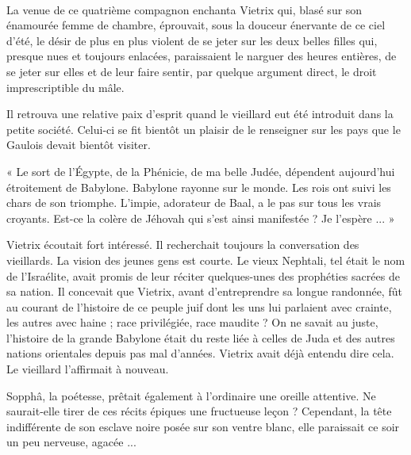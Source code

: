 \documentclass[a4paper, 11pt, oneside, polutonikogreek, french]{article}
\begin{document}
\paragraph{}
La venue de ce quatrième compagnon enchanta Vietrix qui, blasé sur son énamourée femme de chambre, éprouvait, sous la douceur énervante de ce ciel d'été, le désir de plus en plus violent de se jeter sur les deux belles filles qui, presque nues et toujours enlacées, paraissaient le narguer des heures entières, de se jeter sur elles et de leur faire sentir, par quelque argument direct, le droit imprescriptible du mâle.

\bigskip
\centerline{\EightStarTaper}
\centerline{\EightStarTaper\EightStarTaper}
\bigskip

Il retrouva une relative paix d'esprit quand le vieillard eut été introduit dans la petite société. Celui-ci se fit bientôt un plaisir de le renseigner sur les pays que le Gaulois devait bientôt visiter.

« Le sort de l'Égypte, de la Phénicie, de ma belle Judée, dépendent aujourd'hui étroitement de Babylone. Babylone rayonne sur le monde. Les rois ont suivi les chars de son triomphe. L'impie, adorateur de Baal, a le pas sur tous les vrais croyants. Est-ce la colère de Jéhovah qui s'est ainsi manifestée ? Je l'espère ... »

Vietrix écoutait fort intéressé. Il recherchait toujours la conversation des vieillards. La vision des jeunes gens est courte. Le vieux Nephtali, tel était le nom de l'Israélite, avait promis de leur réciter quelques-unes des prophéties sacrées de sa nation. Il concevait que Vietrix, avant d'entreprendre sa longue randonnée, fût au courant de l'histoire de ce peuple juif dont les uns lui parlaient avec crainte, les autres avec haine ; race privilégiée, race maudite ? On ne savait au juste, l'histoire de la grande Babylone était du reste liée à celles de Juda et des autres nations orientales depuis pas mal d'années. Vietrix avait déjà entendu dire cela. Le vieillard l'affirmait à nouveau.

Sopphâ, la poétesse, prêtait également à l'ordinaire une oreille attentive. Ne saurait-elle tirer de ces récits épiques une fructueuse leçon ? Cependant, la tête indifférente de son esclave noire posée sur son ventre blanc, elle paraissait ce soir un peu nerveuse, agacée ...
\end{document}
